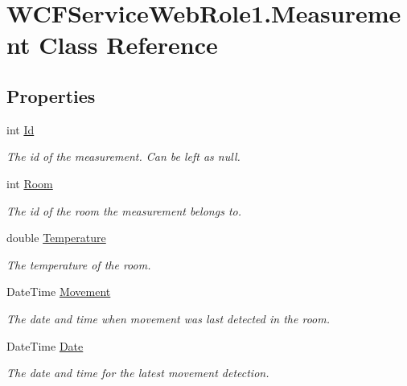\hypertarget{class_w_c_f_service_web_role1_1_1_measurement}{}\section{W\+C\+F\+Service\+Web\+Role1.\+Measurement Class Reference}
\label{class_w_c_f_service_web_role1_1_1_measurement}
\subsection*{Properties}
\begin{DoxyCompactItemize}
\item 
int \hyperlink{class_w_c_f_service_web_role1_1_1_measurement_a80bef1e085de826a7c693516b912c136}{Id}
\begin{DoxyCompactList}\small\item\em The id of the measurement. Can be left as null. \end{DoxyCompactList}\item 
int \hyperlink{class_w_c_f_service_web_role1_1_1_measurement_a37bf0a9d6b3b2aecd532a4de45cc2076}{Room}
\begin{DoxyCompactList}\small\item\em The id of the room the measurement belongs to. \end{DoxyCompactList}\item 
double \hyperlink{class_w_c_f_service_web_role1_1_1_measurement_a27481694219bde22fd509f9ada61fce6}{Temperature}
\begin{DoxyCompactList}\small\item\em The temperature of the room. \end{DoxyCompactList}\item 
Date\+Time \hyperlink{class_w_c_f_service_web_role1_1_1_measurement_a7adec3362734460f2f2106401f496c41}{Movement}
\begin{DoxyCompactList}\small\item\em The date and time when movement was last detected in the room. \end{DoxyCompactList}\item 
Date\+Time \hyperlink{class_w_c_f_service_web_role1_1_1_measurement_a40c9b7acb1a4bf2fe9b1a76cb3b0bfb1}{Date}
\begin{DoxyCompactList}\small\item\em The date and time for the latest movement detection. \end{DoxyCompactList}\end{DoxyCompactItemize}


